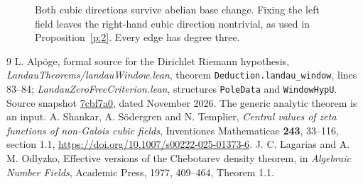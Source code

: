 \documentclass[11pt]{article}
\newcommand{\Gal}{\operatorname{Gal}}
\begin{document}
\begin{figure}[ht]
\centering
{}
\caption{Both cubic directions survive abelian base change. Fixing the
left field leaves the right-hand cubic direction nontrivial, as used in
Proposition~\ref{p:2}. Every edge has degree three.}
\end{figure}
\begin{thebibliography}{9}
 L. Alp\"oge, formal source for the Dirichlet Riemann hypothesis,
\emph{LandauTheorems/landauWindow.lean}, theorem
\texttt{Deduction.landau\_window}, lines 83--84;
\emph{LandauZeroFreeCriterion.lean}, structures
\texttt{PoleData} and \texttt{WindowHypU}. Source snapshot
\href{https://github.com/CocoSgt/riemann-hypothesis-lean/tree/7cbf7a0c32fca1badf05931879a37c3f8a2b03b4/src/Development/AutomorphicArithmetic/DedekindLFunctions}
{7cbf7a0}, dated November 2026. The generic analytic theorem is an input.
 A. Shankar, A. S\"odergren and N. Templier,
\emph{Central values of zeta functions of non-Galois cubic fields},
Inventiones Mathematicae \textbf{243}, 33--116, section 1.1,
\url{https://doi.org/10.1007/s00222-025-01373-6}.
 J. C. Lagarias and A. M. Odlyzko, Effective versions of the
Chebotarev density theorem, in \emph{Algebraic Number Fields},
Academic Press, 1977, 409--464, Theorem 1.1.
\end{thebibliography}
\end{document}
